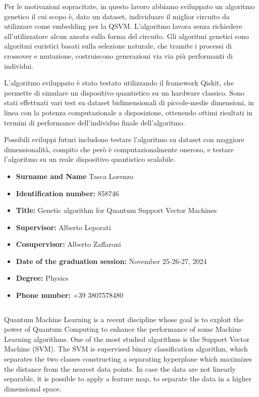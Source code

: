 \documentclass{article}
\begin{document}
Per le motivazioni sopracitate, in questo lavoro abbiamo sviluppato un algoritmo genetico il cui scopo è, dato un dataset, individuare il miglior circuito da utilizzare come embedding per la QSVM. L'algoritmo lavora senza richiedere all'utilizzatore alcun ansatz sulla forma del circuito. Gli algoritmi genetici sono algoritmi euristici basati sulla selezione naturale, che tramite i processi di crossover e mutazione, costruiscono generazioni via via più performanti di individui. 

L'algoritmo sviluppato è stato testato utilizzando il framework Qiskit, che permette di simulare un dispositivo quantistico su un hardware classico. Sono stati effettuati vari test su dataset bidimensionali di piccole-medie dimensioni, in linea con la potenza computazionale a disposizione, ottenendo ottimi risultati in termini di performance dell'individuo finale dell'algoritmo.

Possibili sviluppi futuri includono testare l'algoritmo su dataset con maggiore dimensionalità, compito che però è computazionalmente oneroso, e testare l'algoritmo su un reale dispositivo quantistico scalabile.





\newpage
\begin{itemize}
    \item \textbf{Surname  and Name} Tasca Lorenzo
    \item \textbf{Identification number:} 858746
    \item \textbf{Title:} Genetic algorithm for Quantum Support Vector Machines    
    \item \textbf{Supervisor:} Alberto Leporati
    \item \textbf{Cosupervisor:} Alberto Zaffaroni
    \item \textbf{Date of the graduation session:} November 25-26-27, 2024
    \item \textbf{Degree:} Physics
    \item \textbf{Phone number:} +39 3807578480
    
\end{itemize}
$\,$

Quantum Machine Learning is a recent discipline whose goal is to exploit the power of Quantum Computing to enhance the performance of some Machine Learning algorithms. One of the most studied algorithms is the Support Vector Machine (SVM). The SVM is supervised binary classification algorithm, which separates the two classes constructing a separating hyperplane which maximizes the distance from the nearest data points. In case the data are not linearly separable, it is possible to apply a feature map, to separate the data in a higher dimensional space. 
\end{document}
